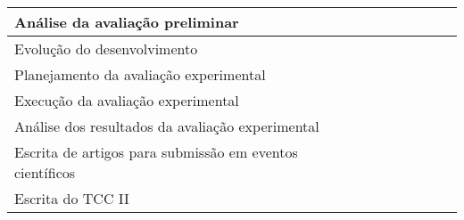 \begin{landscape}
\begin{table}[!htb]
\begin{tabular}{l|c|c|c|c|c|c|c|c|c}
		\hline	
		Análise da avaliação preliminar &&&&&\cellcolor{midgray}&\cellcolor{midgray}&&&\\
		\hline	
		Evolução do desenvolvimento &&&&&\cellcolor{midgray}&\cellcolor{midgray}&\cellcolor{midgray}&\cellcolor{midgray}&\\
		\hline	
		Planejamento da avaliação experimental &&&&&&\cellcolor{midgray}&\cellcolor{midgray}&&\\
		\hline	
		Execução da avaliação experimental &&&&&&&\cellcolor{midgray}&&\\
		\hline	
		Análise dos resultados da avaliação experimental &&&&&&&\cellcolor{midgray}&\cellcolor{midgray}&\\
		\hline	
		Escrita de artigos para submissão em eventos científicos
		&&&&&\cellcolor{midgray}&\cellcolor{midgray}&\cellcolor{midgray}&\cellcolor{midgray}&\cellcolor{midgray}\\
		\hline	
		Escrita do TCC II 
		&&&&&&\cellcolor{midgray}&\cellcolor{midgray}&\cellcolor{midgray}&\cellcolor{midgray}\\
		\toprule	
		\end{tabular}
\end{table}
\end{landscape}


